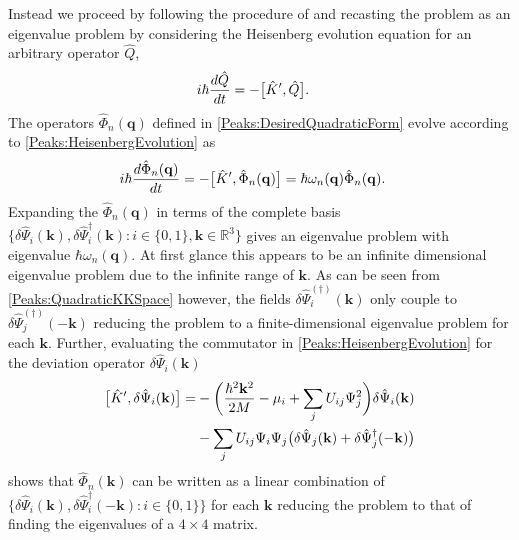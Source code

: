 Instead we proceed by following the procedure of \citep{Leonhardt:2003} and recasting the problem as an eigenvalue problem by considering the Heisenberg evolution equation for an arbitrary operator $\hat{Q}$,
\begin{align}
    i \hbar \frac{d \hat{Q}}{dt} &= -\comm{\hat{K}', \hat{Q}}. \label{Peaks:HeisenbergEvolution}
\end{align}
The operators $\hat{\Phi}_n(\mathbf{q})$ defined in \eqref{Peaks:DesiredQuadraticForm} evolve according to \eqref{Peaks:HeisenbergEvolution} as
\begin{align}
    i \hbar \frac{d \hat{\Phi}_n(\mathbf{q})}{dt} &= -\big[\hat{K}', \hat{\Phi}_n(\mathbf{q})\big] = \hbar \omega_n(\mathbf{q}) \hat{\Phi}_n(\mathbf{q}).
\end{align}
Expanding the $\hat{\Phi}_n(\mathbf{q})$ in terms of the complete basis $\big\{\delta\hat{\Psi}_i(\mathbf{k}), \delta\hat{\Psi}_i^\dagger(\mathbf{k}): i \in \{0, 1\}, \mathbf{k} \in \mathbb{R}^3\big\}$ gives an eigenvalue problem with eigenvalue $\hbar \omega_n(\mathbf{q})$.  At first glance this appears to be an infinite dimensional eigenvalue problem due to the infinite range of $\mathbf{k}$. As can be seen from \eqref{Peaks:QuadraticKKSpace} however, the fields $\delta\hat{\Psi}_i^{(\dagger)}(\mathbf{k})$ only couple to  $\delta\hat{\Psi}_j^{(\dagger)}(-\mathbf{k})$ reducing the problem to a finite-dimensional eigenvalue problem for each $\mathbf{k}$. Further, evaluating the commutator in \eqref{Peaks:HeisenbergEvolution} for the deviation operator $\delta\hat{\Psi}_i(\mathbf{k})$
\begin{align}
    \begin{split}
        \big[\hat{K}', \delta\hat{\Psi}_i(\mathbf{k})\big] =& -\bigg(\frac{\hbar^2 \mathbf{k}^2}{2M} - \mu_i + \sum_j U_{ij} \Psi_j^2\bigg) \delta\hat{\Psi}_i(\mathbf{k})\\
        &- \sum_j U_{ij} \Psi_i \Psi_j \big(\delta\hat{\Psi}_j(\mathbf{k}) + \delta\hat{\Psi}_j^\dagger(-\mathbf{k})\big)
    \end{split}
\end{align}
shows that $\hat{\Phi}_n(\mathbf{k})$ can be written as a linear combination of $\big\{\delta\hat{\Psi}_i(\mathbf{k}), \delta\hat{\Psi}_i^\dagger(-\mathbf{k}) : i \in \{0, 1\}\big\}$ for each $\mathbf{k}$ reducing the problem to that of finding the eigenvalues of a $4\times 4$ matrix.

